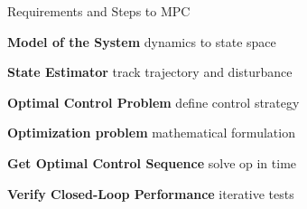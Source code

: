 
\begin{sstTitleBox}[BrickRed]{
    Requirements and Steps to MPC
  }
  \begin{centering}
    \begin{sstOnlyFrame}[BrickRed]
      \small
      \textbf{Model of the System}
      dynamics to state space

      \textbf{State Estimator}
      track trajectory and disturbance

      \textbf{Optimal Control Problem}
      define control strategy

      \textbf{Optimization problem}
      mathematical formulation

      \textbf{Get Optimal Control Sequence}
      solve op in time

      \textbf{Verify Closed-Loop Performance}
      iterative tests
    \end{sstOnlyFrame}
  \end{centering}
\end{sstTitleBox}

